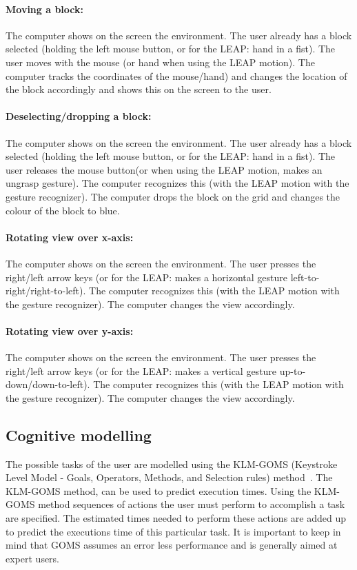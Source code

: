 \paragraph{Moving a block:} The computer shows on the screen the environment. The user already has a block selected (holding the left mouse button, or for the LEAP: hand in a fist). The user moves with the mouse (or hand when using the LEAP motion). The computer tracks the coordinates of the mouse/hand) and changes the location of the block accordingly and shows this on the screen to the user. 
\paragraph{Deselecting/dropping a block:} The computer shows on the screen the environment. The user already has a block selected (holding the left mouse button, or for the LEAP: hand in a fist). The user releases the mouse button(or when using the LEAP motion, makes an ungrasp gesture). The computer recognizes this (with the LEAP motion with the gesture recognizer). The computer drops the block on the grid and changes the colour of the block to blue.
\paragraph{Rotating view over x-axis:} The computer shows on the screen the environment. The user presses the right/left arrow keys (or for the LEAP: makes a horizontal gesture left-to-right/right-to-left). The computer recognizes this (with the LEAP motion with the gesture recognizer). The computer changes the view accordingly.
\paragraph{Rotating view over y-axis:} The computer shows on the screen the environment. The user presses the right/left arrow keys (or for the LEAP: makes a vertical gesture up-to-down/down-to-left). The computer recognizes this (with the LEAP motion with the gesture recognizer). The computer changes the view accordingly.


\subsection{Cognitive modelling}
The possible tasks of the user are modelled using the KLM-GOMS (Keystroke Level Model - Goals, Operators, Methods, and Selection rules) method~\cite{john1996goms}. The KLM-GOMS method, can be used to predict execution times. Using the KLM-GOMS method sequences of actions the user must perform to accomplish a task are specified. The estimated times needed to perform these actions are added up to predict the executions time of this particular task. It is important to keep in mind that GOMS assumes an error less performance and is generally aimed at expert users.

